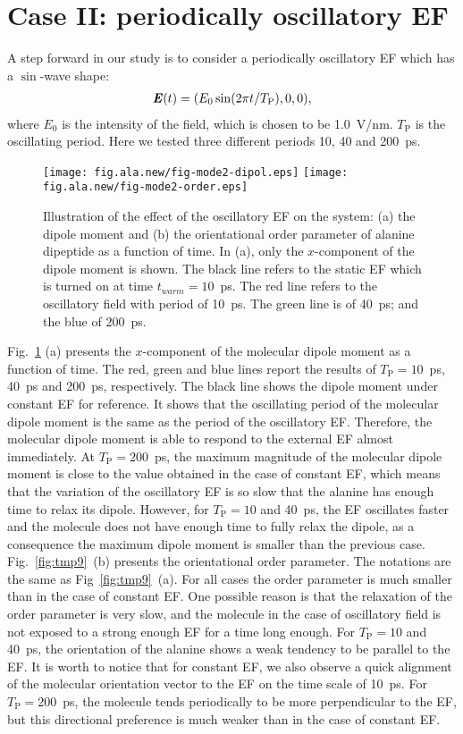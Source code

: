\documentclass[a4paper,preprint,unsortedaddress,onecolumn]{revtex4-1}
\newcommand{\vect}[1]{\textbf{\textit{#1}}}
\newcommand{\period}[0]{T_{\textrm{P}}}
\begin{document}
\section{Case II:
  periodically oscillatory EF}
A step forward in our study is to consider a periodically oscillatory EF which has
a $\sin$-wave shape:
\begin{align}
  \vect E(t) = (E_0\sin(2\pi t / \period), 0, 0),
\end{align}
where $E_0$ is the intensity of the field, which is chosen to be
1.0~V/nm.  $\period$ is the oscillating period.
Here we tested three different
periods 10, 40 and 200~ps.
\begin{figure}
  \centering
  \texttt{[image: fig.ala.new/fig-mode2-dipol.eps]}
  \texttt{[image: fig.ala.new/fig-mode2-order.eps]}
  \caption{Illustration of the effect of the oscillatory EF on the system:
    (a) the dipole moment  and (b) the
    orientational order parameter of alanine dipeptide as a
    function of time. In (a),
    only the $x$-component of the dipole moment is
    shown. The black line refers to the static EF which is turned on
    at time $t_{warm} = 10$~ps. The red line refers to the oscillatory field with period of
    10~ps. The green line is of 40~ps; and the blue of 200~ps.}
  \label{fig:tmp8}
\end{figure}
Fig.~\ref{fig:tmp8} (a)
presents the $x$-component of the molecular dipole moment as
a function of time. The red, green and blue lines report the
results of $\period =10$~ps, 40~ps and 200~ps, respectively. The black line
shows the dipole moment under constant EF
for reference.
It shows that the oscillating period of the molecular dipole moment
is the same as the period of the oscillatory EF. Therefore,
the molecular dipole moment
is able to respond to the external EF almost immediately.
At $\period =200$~ps, the maximum magnitude of the molecular
dipole moment is close to the value obtained in the case of constant EF, which
means that the variation of the oscillatory EF is so slow that the
alanine has enough time to 
relax its dipole. However,
for $\period =10$ and 40~ps, the EF oscillates faster and the molecule 
does not have enough time to fully relax the dipole, as a consequence the maximum dipole moment is smaller than the previous case.
Fig.~\ref{fig:tmp9}~(b) presents the orientational order
parameter. The notations are the same as Fig~\ref{fig:tmp9}~(a).
For all cases the order parameter is much
smaller than in the case of constant EF. One possible reason is that the
relaxation of the order parameter is very slow, and the molecule in the case of oscillatory field is
not exposed to a strong enough EF for a time long enough.
For  $\period =10$ and 40~ps, the orientation of the alanine shows a weak tendency
to be parallel to the EF. It is worth to notice that for constant EF,
we also observe a quick alignment of the molecular orientation vector to the EF
on the time scale of 10~ps. For $\period =200$~ps, the molecule tends periodically
to be more perpendicular to the EF, but this directional preference is much
weaker than in the case of constant EF.
\end{document}
